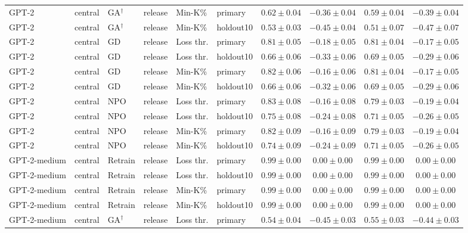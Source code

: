 {\begin{longtable}{@{\extracolsep{\fill}}llllllcccc@{}}
GPT-2 & central & GA$^{\dagger}$ & release & Min-K\% & primary & $0.62 \pm 0.04$ & $-0.36 \pm 0.04$ & $0.59 \pm 0.04$ & $-0.39 \pm 0.04$ \\
GPT-2 & central & GA$^{\dagger}$ & release & Min-K\% & holdout10 & $0.53 \pm 0.03$ & $-0.45 \pm 0.04$ & $0.51 \pm 0.07$ & $-0.47 \pm 0.07$ \\
GPT-2 & central & GD & release & Loss thr. & primary & $0.81 \pm 0.05$ & $-0.18 \pm 0.05$ & $0.81 \pm 0.04$ & $-0.17 \pm 0.05$ \\
GPT-2 & central & GD & release & Loss thr. & holdout10 & $0.66 \pm 0.06$ & $-0.33 \pm 0.06$ & $0.69 \pm 0.05$ & $-0.29 \pm 0.06$ \\
GPT-2 & central & GD & release & Min-K\% & primary & $0.82 \pm 0.06$ & $-0.16 \pm 0.06$ & $0.81 \pm 0.04$ & $-0.17 \pm 0.05$ \\
GPT-2 & central & GD & release & Min-K\% & holdout10 & $0.66 \pm 0.06$ & $-0.32 \pm 0.06$ & $0.69 \pm 0.05$ & $-0.29 \pm 0.06$ \\
GPT-2 & central & NPO & release & Loss thr. & primary & $0.83 \pm 0.08$ & $-0.16 \pm 0.08$ & $0.79 \pm 0.03$ & $-0.19 \pm 0.04$ \\
GPT-2 & central & NPO & release & Loss thr. & holdout10 & $0.75 \pm 0.08$ & $-0.24 \pm 0.08$ & $0.71 \pm 0.05$ & $-0.26 \pm 0.05$ \\
GPT-2 & central & NPO & release & Min-K\% & primary & $0.82 \pm 0.09$ & $-0.16 \pm 0.09$ & $0.79 \pm 0.03$ & $-0.19 \pm 0.04$ \\
GPT-2 & central & NPO & release & Min-K\% & holdout10 & $0.74 \pm 0.09$ & $-0.24 \pm 0.09$ & $0.71 \pm 0.05$ & $-0.26 \pm 0.05$ \\
GPT-2-medium & central & Retrain & release & Loss thr. & primary & $0.99 \pm 0.00$ & $0.00 \pm 0.00$ & $0.99 \pm 0.00$ & $0.00 \pm 0.00$ \\
GPT-2-medium & central & Retrain & release & Loss thr. & holdout10 & $0.99 \pm 0.00$ & $0.00 \pm 0.00$ & $0.99 \pm 0.00$ & $0.00 \pm 0.00$ \\
GPT-2-medium & central & Retrain & release & Min-K\% & primary & $0.99 \pm 0.00$ & $0.00 \pm 0.00$ & $0.99 \pm 0.00$ & $0.00 \pm 0.00$ \\
GPT-2-medium & central & Retrain & release & Min-K\% & holdout10 & $0.99 \pm 0.00$ & $0.00 \pm 0.00$ & $0.99 \pm 0.00$ & $0.00 \pm 0.00$ \\
GPT-2-medium & central & GA$^{\dagger}$ & release & Loss thr. & primary & $0.54 \pm 0.04$ & $-0.45 \pm 0.03$ & $0.55 \pm 0.03$ & $-0.44 \pm 0.03$ \\

\end{longtable}}
